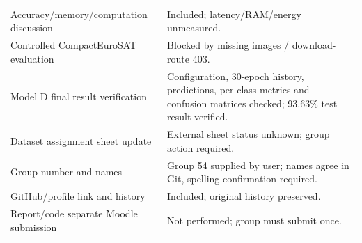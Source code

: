 \documentclass[11pt,a4paper]{article}
\begin{document}
\begin{longtable}{p{.58\linewidth}p{.34\linewidth}}
Accuracy/memory/computation discussion & Included; latency/RAM/energy unmeasured.\\

Controlled CompactEuroSAT evaluation & Blocked by missing images / download-route 403.\\

Model D final result verification & Configuration, 30-epoch history, predictions,
per-class metrics and confusion matrices checked; 93.63\% test result verified.\\

Dataset assignment sheet update & External sheet status unknown; group action required.\\

Group number and names & Group 54 supplied by user; names agree in Git, spelling confirmation required.\\

GitHub/profile link and history & Included; original history preserved.\\

Report/code separate Moodle submission & Not performed; group must submit once.\\

\bottomrule\end{longtable}
\end{document}
